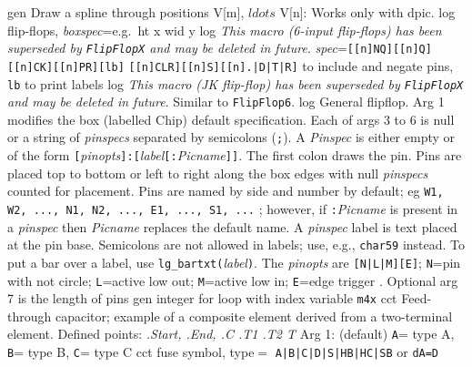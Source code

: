  {gen}
  {Draw a spline through positions V[m], $ldots$ V[n]: Works only with dpic.}
  {log}
  {flip-flops,
  {\sl boxspec}=e.g.\ ht x wid y }
  {log}
  {{\em This macro (6-input flip-flops)
    has been superseded by {\tt FlipFlopX} and may be deleted
    in future}.
    {\sl spec}={\tt [[n]NQ][[n]Q][[n]CK][[n]PR][lb]}
    {\tt [[n]CLR][[n]S][[n].|D|T|R]} to include and negate pins,
    {\tt lb} to print labels }
  {log}
  {{\em This macro (JK flip-flop)
    has been superseded by {\tt FlipFlopX} and may be deleted
    in future}.
   Similar to {\tt FlipFlop6}.}
  {log}
  {General flipflop.
   Arg 1 modifies the box (labelled Chip) default specification.
   Each of args 3 to 6 is null or a string of {\sl pinspecs}
   separated by semicolons ({\tt;}).  A {\sl Pinspec} is either empty
   or of the form
   {\tt[}{\sl pinopts}{\tt]:[}{\sl label}{\tt[:}{\sl Picname}{\tt]]}.
   The first colon draws the pin.
   Pins are placed top to bottom or left to right along the box edges with
   null {\sl pinspecs} counted for placement. Pins are named by side and number
   by default; eg {\tt W1, W2, ..., N1, N2, ..., E1, ..., S1, ...} ; however,
   if {\tt:}{\sl Picname} is present in a {\sl pinspec} then {\sl Picname}
   replaces the default name.
   A {\sl pinspec} label is text placed at the pin base. Semicolons are
   not allowed in labels; use, e.g., {\tt {}char59}
   instead.
   To put a bar over a label, use {\tt lg\_bartxt(}{\sl label}{\tt)}.
   The {\sl pinopts} are {\tt[N|L|M][E]};
 {\tt N}=pin with not circle;
 {\tt L}=active low out; {\tt M}=active low in;
 {\tt E}=edge trigger . Optional arg 7 is the length
 of pins}
  {gen}
  {integer for loop with index variable {\tt m4x} }
  {cct}
  {Feed-through capacitor; example of a composite element derived from
   a two-terminal element.  Defined points: {\sl .Start, .End, .C .T1 .T2 T}
   Arg 1: (default) {\tt A}= type A, {\tt B}= type B, {\tt C}= type C 
   }
  {cct}
  {fuse symbol, type$=$
  {\tt  A|B|C|D|S|HB|HC|SB} or {\tt dA=D}}
